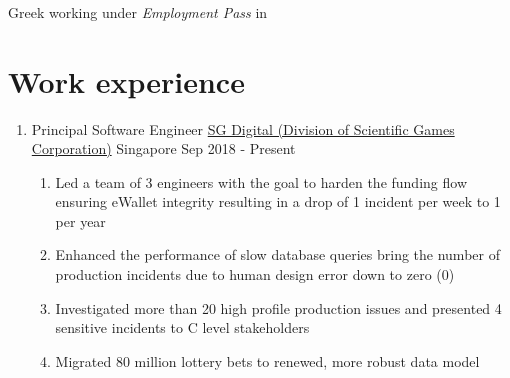 \documentclass{CVSoftwareEngineer}
\begin{document}
	\section{\textbf{\cvname}}
	\begin{center}
		\href{mailto:\cvmail}{\cvmail} \space \textbar \space \cvlinkedin \space \textbar \space \cvgithub \\
		Greek working under \textit{Employment Pass} in \cvaddress
	\end{center}

	\section{Work experience}
	\begin{enumerate}[labelwidth=!, labelindent=0pt, leftmargin=*, rightmargin=15pt]
		\item[] \cvExperience
			{Principal Software Engineer}
			{\href{https://www.sgdigital.com/}{SG Digital (Division of Scientific Games Corporation)}}
			{Singapore}
			{Sep 2018 - Present}
			{\begin{enumerate}[labelwidth=!, labelindent=0pt, nosep, leftmargin=*]
					\item[\textasteriskcentered] Led a team of 3 engineers with the goal to harden the
						funding flow ensuring eWallet integrity resulting in a drop of 1 incident per week
						to 1 per year
					\item[\textasteriskcentered] Enhanced the performance of slow database queries bring
						the number of production incidents due to human design error down to zero (0)
					\item[\textasteriskcentered] Investigated more than 20 high profile production
						issues and presented 4 sensitive incidents to C level stakeholders
					\item[\textasteriskcentered] Migrated 80 million lottery bets to renewed,
						more robust data model
				\end{enumerate}
			}


\end{enumerate}
\end{document}

